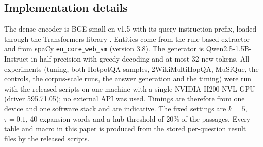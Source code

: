 \documentclass[a4paper,fleqn]{cas-sc}
\begin{document}
\subsection{Implementation details}
The dense encoder is BGE-small-en-v1.5 with its query instruction prefix, loaded through the Transformers library \citep{wolf2020transformers}. Entities come from the rule-based extractor and from spaCy \texttt{en\_core\_web\_sm} (version 3.8). The generator is Qwen2.5-1.5B-Instruct \citep{qwen2024qwen25} in half precision with greedy decoding and at most 32 new tokens. All experiments (tuning, both HotpotQA samples, 2WikiMultiHopQA, MuSiQue, the controls, the corpus-scale runs, the answer generation and the timing) were run with the released scripts on one machine with a single NVIDIA H200 NVL GPU (driver 595.71.05); no external API was used. Timings are therefore from one device and one software stack and are indicative. The fixed settings are $k=5$, $\tau=0.1$, 40 expansion words and a hub threshold of 20\% of the passages. Every table and macro in this paper is produced from the stored per-question result files by the released scripts.
\end{document}

